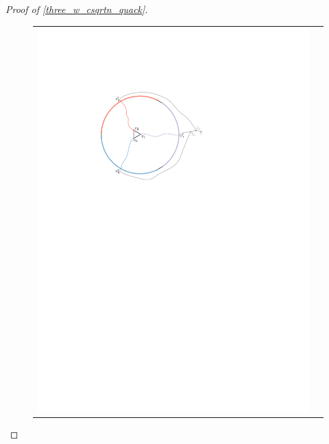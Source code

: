 \documentclass{patmorin}
\begin{document}
\begin{proof}[Proof of \cref{three_w_csqrtn_quack}]
  \begin{figure}
    \centering
    \begin{tabular}{cc}
      \includegraphics[page=1]{figs/second_case} &

\end{tabular}
\end{figure}
\end{proof}
\end{document}
